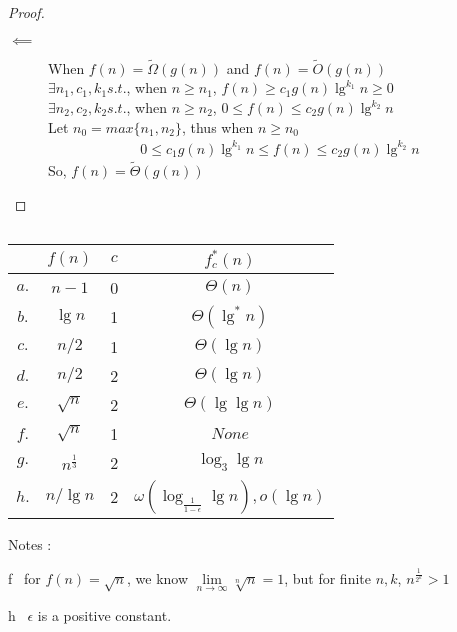 \documentclass[paper=a4, fontsize=11pt,oneside]{book} %
\numberwithin{equation}{section} %
\numberwithin{figure}{section} %
\numberwithin{table}{section} %
\begin{document}
\begin{enumerate}
\begin{proof}
\begin{description}
			 				\item[$\impliedby$]
			 				When $f(n) = \widetilde{\Omega}(g(n))$ and $f(n) = \widetilde{O}(g(n))$ \\
			 				$\exists n_1, c_1,k_1 s.t.$, when $n \geq n_1$, $f(n) \geq c_1g(n)\lg^{k_1}n \geq 0$ \\
			 				$\exists n_2, c_2,k_2 s.t.$, when $n \geq n_2$, $0 \leq f(n) \leq c_2g(n)\lg^{k_2}n$ \\
			 				Let $n_0 = max\{n_1, n_2\}$, thus when $n \geq n_0$
			 				\begin{align*}
			 				0 \leq c_1g(n)\lg^{k_1}n \leq f(n) \leq c_2g(n)\lg^{k_2}n
			 				\end{align*}
			 				So, $f(n) = \widetilde{\Theta}(g(n))$
			 			\end{description}
			 		\end{proof}
					\end{enumerate}
					
		 \subsection{}
		 \begin{center}
			 \begin{tabular}{ccc|c|}
			 	&$f(n)$&$c$&$f_c^*(n)$  \\ \hline
			 	\textbf{$a.$}&$n-1$&0&$\Theta(n)$ \\ \hline
			 	\textbf{$b.$}&$\lg n$&1&$\Theta(\lg^*n)$ \\ \hline
			 	\textbf{$c.$}&$n/2$&1&$\Theta(\lg n)$ \\ \hline
			 	\textbf{$d.$}&$n/2$&2&$\Theta(\lg n)$ \\ \hline
			 	\textbf{$e.$}&$\sqrt{n}$&2&$\Theta(\lg \lg n)$ \\ \hline
			 	\textbf{$f.$}&$\sqrt{n}$&1&$None$ \\ \hline
			 	\textbf{$g.$}&$n^{\frac{1}{3}}$&2&$\log_{3}\lg n$ \\ \hline
			 	\textbf{$h.$}&$n/\lg n$&2&$\omega(\log_{\frac{1}{1-\epsilon}}\lg n), o(\lg n)$ \\ \hline
			 \end{tabular}
			 		 \end{center}
			Notes : 
			
			
			{\color{cyan} f}     \  for $f(n) = \sqrt{n}$, we know $\lim\limits_{n\rightarrow\infty}\sqrt[n]{n} = 1$, but for finite $n,k$, $n^{\frac{1}{2^k}} > 1$
			
			{\color{cyan} h} \   $\epsilon$ is a positive constant.
\end{document}
